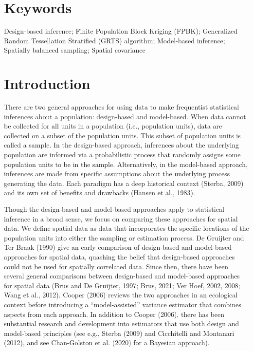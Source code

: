 \documentclass[]{elsarticle} %
\begin{document}
\hypertarget{keywords}{%
\section*{Keywords}\label{keywords}}

Design-based inference; Finite Population Block Kriging (FPBK);
Generalized Random Tessellation Stratified (GRTS) algorithm; Model-based
inference; Spatially balanced sampling; Spatial covariance

\hypertarget{sec:introduction}{%
\section{Introduction}\label{sec:introduction}}

There are two general approaches for using data to make frequentist
statistical inferences about a population: design-based and model-based.
When data cannot be collected for all units in a population (i.e.,
population units), data are collected on a subset of the population
units. This subset of population units is called a sample. In the
design-based approach, inferences about the underlying population are
informed via a probabilistic process that randomly assigns some
population units to be in the sample. Alternatively, in the model-based
approach, inferences are made from specific assumptions about the
underlying process generating the data. Each paradigm has a deep
historical context (Sterba, 2009) and its own set of benefits and
drawbacks (Hansen et al., 1983).

Though the design-based and model-based approaches apply to statistical
inference in a broad sense, we focus on comparing these approaches for
spatial data. We define spatial data as data that incorporates the
specific locations of the population units into either the sampling or
estimation process. De Gruijter and Ter Braak (1990) give an early
comparison of design-based and model-based approaches for spatial data,
quashing the belief that design-based approaches could not be used for
spatially correlated data. Since then, there have been several general
comparisons between design-based and model-based approaches for spatial
data (Brus and De Gruijter, 1997; Brus, 2021; Ver Hoef, 2002, 2008; Wang
et al., 2012). Cooper (2006) reviews the two approaches in an ecological
context before introducing a ``model-assisted'' variance estimator that
combines aspects from each approach. In addition to Cooper (2006), there
has been substantial research and development into estimators that use
both design and model-based principles (see e.g., Sterba (2009) and
Cicchitelli and Montanari (2012), and see Chan-Golston et al. (2020) for
a Bayesian approach).
\end{document}
